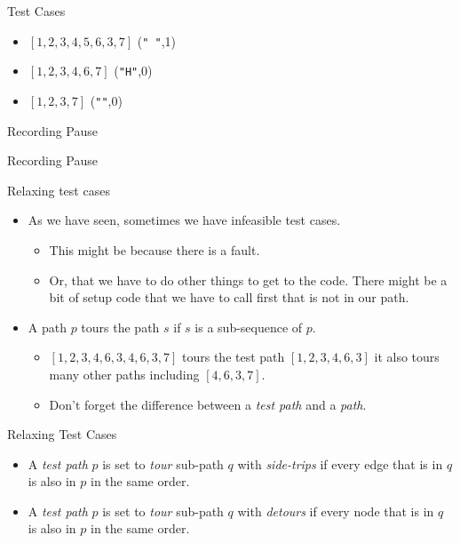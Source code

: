 \documentclass[handout]{beamer}
\newcommand{\recordingpause}{
\begin{frame}{Recording Pause}
  \begin{center}
    Recording Pause
  \end{center}
\end{frame}
}
\begin{document}
\begin{frame}{Test Cases}
  \begin{itemize}
  \item $[1,2,3,4,5,6,3,7]$  ({\tt " "},1)
  \item $[1,2,3,4,6,7]$    ({\tt "H"},0)
  \item $[1,2,3,7]$       ({\tt ""},0)
  \end{itemize}
  \end{frame}

\recordingpause

\begin{frame}{Relaxing test cases}
  \begin{itemize}
  \item As we have seen, sometimes we have infeasible test cases.
    \begin{itemize}
    \item This might be because there is a fault.
    \item Or, that we have to do other things to get to the
      code. There might be a bit of setup code that we have to call
      first that is not in our path.
    \end{itemize}
  \item A path $p$ tours the path $s$ if $s$ is a sub-sequence of $p$.
    \begin{itemize}
    \item $[1,2,3,4,6,3,4,6,3,7]$ tours  the test path $[1,2,3,4,6,3]$ it
      also tours many other paths including $[4,6,3,7]$. 
    \item Don't forget the difference between a {\it test path} and a {\it path}.
    \end{itemize}
  \end{itemize}
    
\end{frame}
\begin{frame}{Relaxing Test Cases}
  \begin{itemize}
  \item A {\it test path} $p$ is set to {\em tour} sub-path $q$ with {\em
      side-trips} if every edge that is in $q$ is also in $p$ in the
    same order.
  \item A {\it test path} $p$ is set to {\em tour} sub-path $q$ with {\em
      detours} if every node that is in $q$ is also in $p$ in the
    same order.
  \end{itemize}
  
\end{frame}
\end{document}
